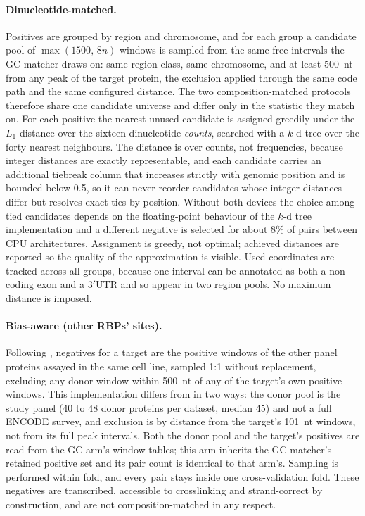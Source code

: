 \paragraph{Dinucleotide-matched.} Positives are grouped by region and chromosome, and for each
group a candidate pool of $\max(1500,\, 8n)$ windows is sampled from the same free intervals the
GC matcher draws on: same region class, same chromosome, and at least 500~nt from any peak of the
target protein, the exclusion applied through the same code path and the same configured distance.
The two composition-matched protocols therefore share one candidate universe and differ only in
the statistic they match on. For each positive the nearest
unused candidate is assigned greedily under the $L_1$ distance over the sixteen dinucleotide
\emph{counts}, searched with a $k$-d tree over the forty nearest neighbours. The distance is over counts, not frequencies, because integer
distances are exactly representable, and each candidate carries an additional
tiebreak column that increases strictly with genomic position and is
bounded below 0.5, so it can never reorder candidates whose integer distances differ but resolves
exact ties by position. Without both devices the choice among tied candidates depends on the
floating-point behaviour of the $k$-d tree implementation and a different negative is selected
for about 8\% of pairs between CPU architectures. Assignment is greedy, not optimal;
achieved distances are reported so the quality of the approximation is visible. Used coordinates
are tracked across all groups, because one interval can be annotated as both a non-coding exon
and a 3$'$UTR and so appear in two region pools. No maximum distance is imposed.

\paragraph{Bias-aware (other RBPs' sites).} Following \citet{horlacher2023}, negatives for a
target are the positive windows of the other panel proteins assayed in the same cell line,
sampled 1:1 without replacement, excluding any donor window within 500~nt of any of the target's
own positive windows. This implementation differs from \citet{horlacher2023} in two ways: the donor
pool is the study panel (40 to 48 donor proteins per dataset, median 45) and not a full
ENCODE survey, and exclusion is by distance from the target's 101~nt windows, not from its
full peak intervals. Both the donor pool and the target's positives are read from the GC arm's
window tables; this arm inherits the GC matcher's retained positive set and its pair count is
identical to that arm's. Sampling is performed within fold, and every pair stays inside one
cross-validation fold. These negatives are transcribed, accessible to crosslinking and
strand-correct by construction, and are not composition-matched in any respect.

